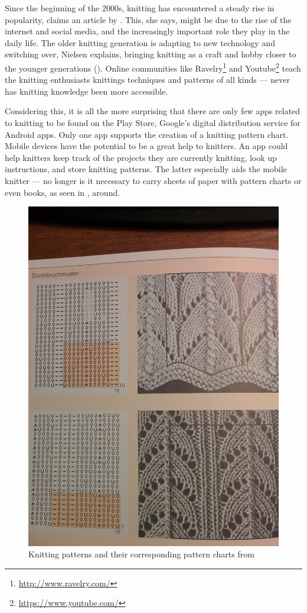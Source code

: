 Since the beginning of the 2000s, knitting has encountered a steady rise in popularity, claims an article by \cite{lewis_rise_of_knitting}. This, she says, might be due to the rise of the internet and social media, and the increasingly important role they play in the daily life. The older knitting generation is adapting to new technology and switching over, Nielsen explains, bringing knitting as a craft and hobby closer to the younger generations (\cite{lewis_rise_of_knitting}). Online communities like Ravelry\footnote{\url{http://www.ravelry.com/}} and Youtube\footnote{\url{https://www.youtube.com/}} teach the knitting enthusiasts knittings techniques and patterns of all kinds --- never has knitting knowledge been more accessible.

Considering this, it is all the more surprising that there are only few apps related to knitting to be found on the Play Store, Google's digital distribution service for Android apps. Only one app supports the creation of a knitting pattern chart. Mobile devices have the potential to be a great help to knitters. An app could help knitters keep track of the projects they are currently knitting, look up instructions, and store knitting patterns. The latter especially aids the mobile knitter --- no longer is it necessary to carry sheets of paper with pattern charts or even books, as seen in , around.

\begin{figure}[H]
	\centering
	\label{fig:knitting_book}
    \includegraphics[width=.45\textwidth]{images/knitting_pattern_chart_book.jpg}
   \caption[{Knitting patterns and their corresponding pattern charts \protect{}}]{Knitting patterns and their corresponding pattern charts from \protect\cite[p142]{Natter1983}}
\end{figure}

